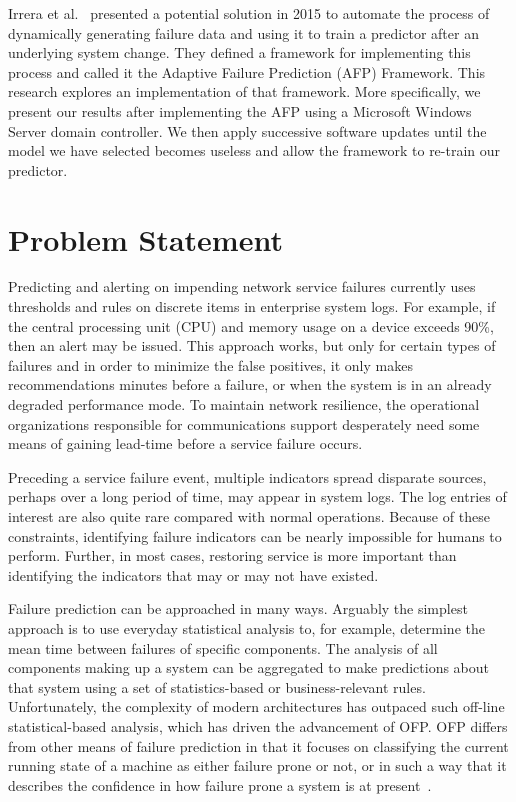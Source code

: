 Irrera et al.~\cite{irrera2015} presented a potential solution in 2015 to
automate the process of dynamically generating failure data and using it to
train a predictor after an underlying system change.  They defined a framework
for implementing this process and called it the Adaptive Failure Prediction
(AFP) Framework.  This research explores an implementation of that framework.
More specifically, we present our results after implementing the AFP using a
Microsoft Windows Server domain controller.  We then apply successive software
updates until the model we have selected becomes useless and allow the
framework to re-train our predictor.

\section{Problem Statement}
Predicting and alerting on impending network service failures currently uses
thresholds and rules on discrete items in enterprise system logs.  For example,
if the central processing unit (CPU) and memory usage on a device exceeds 90\%,
then an alert may be issued.  This approach works, but only for certain types
of failures and in order to minimize the false positives, it only makes
recommendations minutes before a failure, or when the system is in an already
degraded performance mode.  To maintain network resilience, the operational
organizations responsible for communications support desperately need some
means of gaining lead-time before a service failure occurs.  

Preceding a service failure event, multiple indicators spread disparate
sources, perhaps over a long period of time, may appear in system logs.  The
log entries of interest are also quite rare compared with normal operations.
Because of these constraints, identifying failure indicators can be nearly
impossible for humans to perform.  Further, in most cases, restoring service is
more important than identifying the indicators that may or may not have
existed.  

Failure prediction can be approached in many ways. Arguably the simplest
approach is to use everyday statistical analysis to, for example, determine the
mean time between failures of specific components. The analysis of all
components making up a system can be aggregated to make predictions about that
system using a set of statistics-based or business-relevant rules.
Unfortunately, the complexity of modern architectures has outpaced such
off-line statistical-based analysis, which has driven the advancement of OFP.
OFP differs from other means of failure prediction in that it focuses on
classifying the current running state of a machine as either failure prone or
not, or in such a way that it describes the confidence in how failure prone a
system is at present~\cite{salfnerSurvey}.

